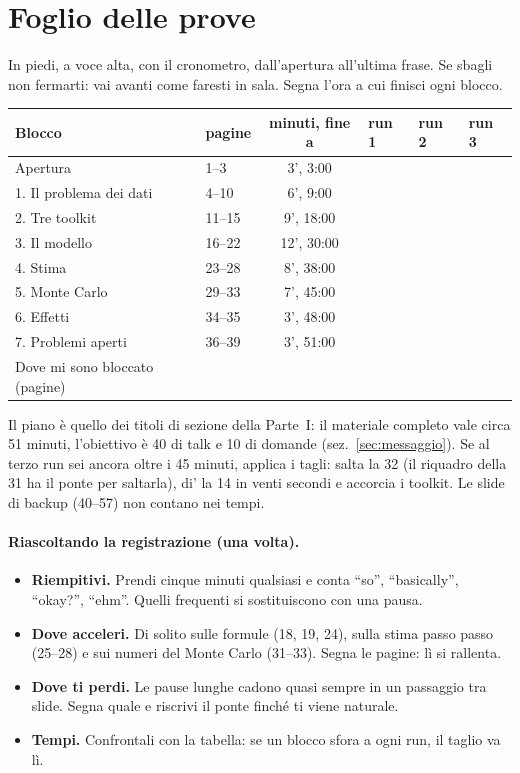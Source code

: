 \documentclass[11pt,a4paper]{article}
\begin{document}
\section{Foglio delle prove}\label{sec:foglio}
In piedi, a voce alta, con il cronometro, dall'apertura all'ultima frase. Se sbagli non fermarti: vai avanti come faresti in sala. Segna l'ora a cui finisci ogni blocco.
\begin{center}
\renewcommand{\arraystretch}{1.6}
\begin{tabular}{llcp{1.7cm}p{1.7cm}p{1.7cm}}\toprule
Blocco & pagine & minuti, fine a & run 1 & run 2 & run 3\\\midrule
Apertura & 1--3 & 3', 3:00 &&&\\
1. Il problema dei dati & 4--10 & 6', 9:00 &&&\\
2. Tre toolkit & 11--15 & 9', 18:00 &&&\\
3. Il modello & 16--22 & 12', 30:00 &&&\\
4. Stima & 23--28 & 8', 38:00 &&&\\
5. Monte Carlo & 29--33 & 7', 45:00 &&&\\
6. Effetti & 34--35 & 3', 48:00 &&&\\
7. Problemi aperti & 36--39 & 3', 51:00 &&&\\\midrule
Dove mi sono bloccato (pagine) & & &&&\\\bottomrule
\end{tabular}
\end{center}
Il piano è quello dei titoli di sezione della Parte~I: il materiale completo vale circa 51 minuti, l'obiettivo è 40 di talk e 10 di domande (sez.~\ref{sec:messaggio}). Se al terzo run sei ancora oltre i 45 minuti, applica i tagli: salta la 32 (il riquadro della 31 ha il ponte per saltarla), di' la 14 in venti secondi e accorcia i toolkit. Le slide di backup (40--57) non contano nei tempi.

\paragraph{Riascoltando la registrazione (una volta).}
\begin{itemize}[nosep]
\item \textbf{Riempitivi.} Prendi cinque minuti qualsiasi e conta ``so'', ``basically'', ``okay?'', ``ehm''. Quelli frequenti si sostituiscono con una pausa.
\item \textbf{Dove acceleri.} Di solito sulle formule (18, 19, 24), sulla stima passo passo (25--28) e sui numeri del Monte Carlo (31--33). Segna le pagine: lì si rallenta.
\item \textbf{Dove ti perdi.} Le pause lunghe cadono quasi sempre in un passaggio tra slide. Segna quale e riscrivi il ponte finché ti viene naturale.
\item \textbf{Tempi.} Confrontali con la tabella: se un blocco sfora a ogni run, il taglio va lì.
\end{itemize}
\end{document}
